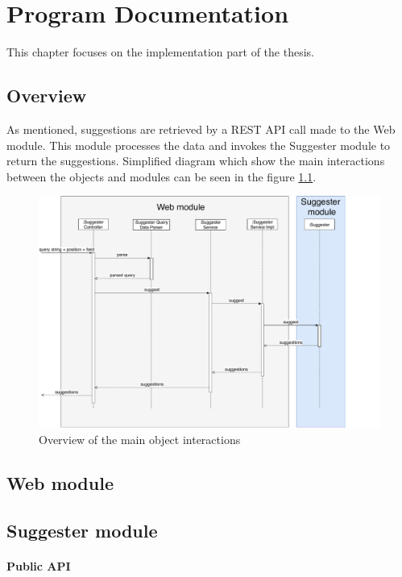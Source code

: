 \chapter{Program Documentation}
\label{chap:program}

This chapter focuses on the implementation part of the thesis.

\section{Overview}
As mentioned, suggestions are retrieved by a REST API call made to the Web module. This module processes the data and
invokes the Suggester module to return the suggestions. Simplified diagram which show the main interactions between the
objects and modules can be seen in the figure \ref{programmer_sequence}.
\begin{figure}[htbp]
    \centering
    \includegraphics[width=145mm]{../img/programmer_sequence.pdf}
    \caption{Overview of the main object interactions}
    \label{programmer_sequence}
\end{figure}

\section{Web module}

\section{Suggester module}

\subsubsection{Public API}

